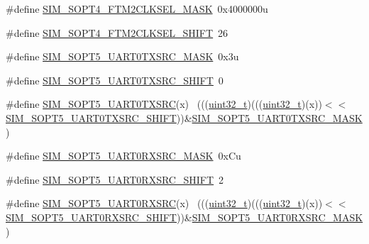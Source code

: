 \begin{DoxyCompactItemize}
\item 
\#define \hyperlink{group___s_i_m___register___masks_ga8e9ace9af53ead470265ca2338402dae}{S\+I\+M\+\_\+\+S\+O\+P\+T4\+\_\+\+F\+T\+M2\+C\+L\+K\+S\+E\+L\+\_\+\+M\+A\+SK}~0x4000000u
\item 
\#define \hyperlink{group___s_i_m___register___masks_ga4b5b8e4dc00734623d8a16db8ff0510c}{S\+I\+M\+\_\+\+S\+O\+P\+T4\+\_\+\+F\+T\+M2\+C\+L\+K\+S\+E\+L\+\_\+\+S\+H\+I\+FT}~26
\item 
\#define \hyperlink{group___s_i_m___register___masks_ga11646c1292cb7aab3128e1e563847e32}{S\+I\+M\+\_\+\+S\+O\+P\+T5\+\_\+\+U\+A\+R\+T0\+T\+X\+S\+R\+C\+\_\+\+M\+A\+SK}~0x3u
\item 
\#define \hyperlink{group___s_i_m___register___masks_ga0220b88df4a0747579d24b77f4db4e67}{S\+I\+M\+\_\+\+S\+O\+P\+T5\+\_\+\+U\+A\+R\+T0\+T\+X\+S\+R\+C\+\_\+\+S\+H\+I\+FT}~0
\item 
\#define \hyperlink{group___s_i_m___register___masks_gaae8f435ecf7230b287a09bcb1bad59e0}{S\+I\+M\+\_\+\+S\+O\+P\+T5\+\_\+\+U\+A\+R\+T0\+T\+X\+S\+RC}(x)                                ~(((\hyperlink{_p_e___types_8h_a33594304e786b158f3fb30289278f5af}{uint32\+\_\+t})(((\hyperlink{_p_e___types_8h_a33594304e786b158f3fb30289278f5af}{uint32\+\_\+t})(x))$<$$<$\hyperlink{group___s_i_m___register___masks_ga0220b88df4a0747579d24b77f4db4e67}{S\+I\+M\+\_\+\+S\+O\+P\+T5\+\_\+\+U\+A\+R\+T0\+T\+X\+S\+R\+C\+\_\+\+S\+H\+I\+FT}))\&\hyperlink{group___s_i_m___register___masks_ga11646c1292cb7aab3128e1e563847e32}{S\+I\+M\+\_\+\+S\+O\+P\+T5\+\_\+\+U\+A\+R\+T0\+T\+X\+S\+R\+C\+\_\+\+M\+A\+SK})
\item 
\#define \hyperlink{group___s_i_m___register___masks_ga6160de3cd4b7169ac9095c0d0eee46f7}{S\+I\+M\+\_\+\+S\+O\+P\+T5\+\_\+\+U\+A\+R\+T0\+R\+X\+S\+R\+C\+\_\+\+M\+A\+SK}~0x\+Cu
\item 
\#define \hyperlink{group___s_i_m___register___masks_ga27e87f2f792b880bd156907ab20e9910}{S\+I\+M\+\_\+\+S\+O\+P\+T5\+\_\+\+U\+A\+R\+T0\+R\+X\+S\+R\+C\+\_\+\+S\+H\+I\+FT}~2
\item 
\#define \hyperlink{group___s_i_m___register___masks_gae1482daef7671b82d865a1cefd37c8de}{S\+I\+M\+\_\+\+S\+O\+P\+T5\+\_\+\+U\+A\+R\+T0\+R\+X\+S\+RC}(x)                                ~(((\hyperlink{_p_e___types_8h_a33594304e786b158f3fb30289278f5af}{uint32\+\_\+t})(((\hyperlink{_p_e___types_8h_a33594304e786b158f3fb30289278f5af}{uint32\+\_\+t})(x))$<$$<$\hyperlink{group___s_i_m___register___masks_ga27e87f2f792b880bd156907ab20e9910}{S\+I\+M\+\_\+\+S\+O\+P\+T5\+\_\+\+U\+A\+R\+T0\+R\+X\+S\+R\+C\+\_\+\+S\+H\+I\+FT}))\&\hyperlink{group___s_i_m___register___masks_ga6160de3cd4b7169ac9095c0d0eee46f7}{S\+I\+M\+\_\+\+S\+O\+P\+T5\+\_\+\+U\+A\+R\+T0\+R\+X\+S\+R\+C\+\_\+\+M\+A\+SK})

\end{DoxyCompactItemize}
